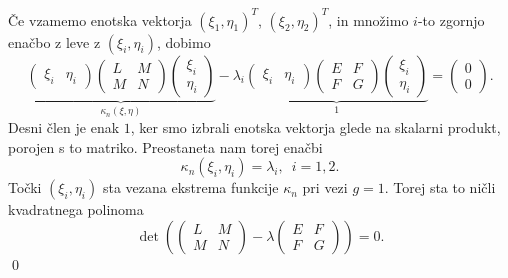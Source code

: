    Če vzamemo enotska vektorja $(\xi_1, \eta_1)^{T}$, $(\xi_2, \eta_2)^{T}$, in množimo $i$-to zgornjo enačbo z leve z $(\xi_i, \eta_i)$, 
    dobimo 
    \begin{equation*}
        \underbrace{\begin{pmatrix}
            \xi_i & \eta_i
        \end{pmatrix}
            \begin{pmatrix}
          L & M \\
          M & N
          \end{pmatrix}\begin{pmatrix}
            \xi_i \\
            \eta_i
        \end{pmatrix}}_{\kappa_n(\xi, \eta)}    - \lambda_i 
        \underbrace{\begin{pmatrix}
            \xi_i & \eta_i
        \end{pmatrix}
        \begin{pmatrix}
        E & F \\
        F & G
        \end{pmatrix} \begin{pmatrix}
            \xi_i \\
            \eta_i
        \end{pmatrix}}_1  =  \begin{pmatrix}
            0 \\
            0
        \end{pmatrix}.
     \end{equation*}
     Desni člen je enak $1$, ker smo izbrali enotska vektorja glede na skalarni produkt, porojen s to matriko. Preostaneta nam torej enačbi \begin{equation*}
       \kappa_n(\xi_i, \eta_i) = \lambda_i, \,\,\, i = 1,2.
     \end{equation*}  
     Točki $(\xi_i, \eta_i)$ sta vezana ekstrema funkcije $\kappa_n$ pri vezi $g = 1$. Torej sta to ničli kvadratnega polinoma
     \begin{equation*}
        \det \left( 
         \begin{pmatrix}
       L & M \\
       M & N
       \end{pmatrix}  - \lambda \begin{pmatrix}
     E & F \\
     F & G
     \end{pmatrix} \right) = 0.
      \end{equation*} 
\qed

